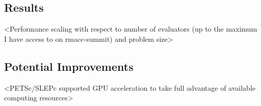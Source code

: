 \subsection{Results}

{\color{blue} \noindent <Linear relationship between number of eigenvalues in an interval and the time it takes to solve that interval> }

{\color{blue} \noindent <Performance scaling with respect to number of evaluators (up to the maximum I have access to on rmacc-summit) and problem size> }

{\color{blue}  }

{\color{blue} \noindent <Load imbalance results with respect to number of subproblems per evaluator> }

{\color{blue} \noindent <Comparison of performance and accuracy of exact and approximate interval counting> }

\subsection{Potential Improvements}

{\color{blue} \noindent <PETSc/SLEPc supported GPU acceleration to take full advantage of available computing resources> }

{\color{blue} \noindent <Describe how even if GPU-accelerated eigenvalue solve sees no performance gain over CPU, it can function as an extra evaluator resulting in further ability to divide work> }

{\color{blue} \noindent <Explain that load imbalance is mostly minimized, however, with the addition of GPU evaluators, it may be necessary to implement a task queue to ensure that an evaluator is only idle if there is no more work available for anyone> }